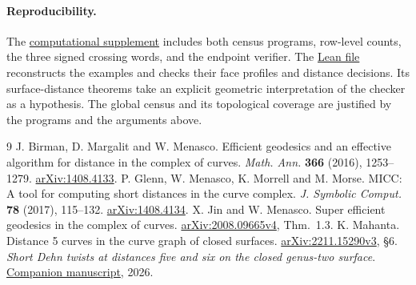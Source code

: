 \documentclass[11pt,a4paper]{article}
\newcommand{\repo}{https://github.com/LiquidGunay/short-twists-curve-graph}
\begin{document}
\paragraph{Reproducibility.}
The \href{\repo/tree/main/computations/minimum}{computational supplement}
includes both census programs, row-level counts, the three signed crossing words,
and the endpoint verifier. The \href{\repo/blob/main/proof/MinimumExamples.lean}{Lean
file} reconstructs the examples and checks their face profiles and distance
decisions. Its surface-distance theorems take an explicit geometric
interpretation of the checker as a hypothesis. The global census and its
topological coverage are justified by the programs and the arguments above.

\begin{thebibliography}{9}\small
{} J. Birman, D. Margalit and W. Menasco. Efficient geodesics and an effective
algorithm for distance in the complex of curves. \emph{Math. Ann.} \textbf{366}
(2016), 1253--1279. \href{https://arxiv.org/abs/1408.4133}{arXiv:1408.4133}.
 P. Glenn, W. Menasco, K. Morrell and M. Morse. MICC: A tool for computing
short distances in the curve complex. \emph{J. Symbolic Comput.} \textbf{78}
(2017), 115--132. \href{https://arxiv.org/abs/1408.4134}{arXiv:1408.4134}.
 X. Jin and W. Menasco. Super efficient geodesics in the complex of curves.
\href{https://arxiv.org/pdf/2008.09665v4}{arXiv:2008.09665v4}, Thm.~1.3.
 K. Mahanta. Distance 5 curves in the curve graph of closed surfaces.
\href{https://arxiv.org/pdf/2211.15290v3}{arXiv:2211.15290v3}, \S6.
 \emph{Short Dehn twists at distances five and six on the closed genus-two
surface}. \href{\repo/blob/main/paper/short-twists.pdf}{Companion manuscript}, 2026.
\end{thebibliography}
\end{document}
